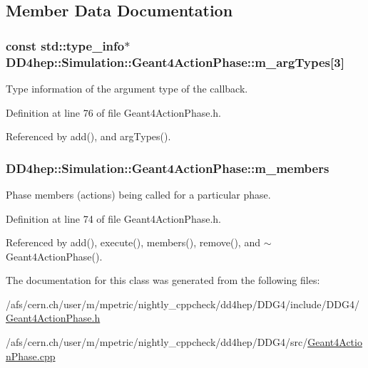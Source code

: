 \subsection{Member Data Documentation}
\hypertarget{class_d_d4hep_1_1_simulation_1_1_geant4_action_phase_a92e33c1a9f3cdbd49cf3b31a61213f57}{
\subsubsection[{m\_\-argTypes}]{\setlength{\rightskip}{0pt plus 5cm}const std::type\_\-info$\ast$ {\bf DD4hep::Simulation::Geant4ActionPhase::m\_\-argTypes}\mbox{[}3\mbox{]}}}
\label{class_d_d4hep_1_1_simulation_1_1_geant4_action_phase_a92e33c1a9f3cdbd49cf3b31a61213f57}


Type information of the argument type of the callback. 

Definition at line 76 of file Geant4ActionPhase.h.

Referenced by add(), and argTypes().\hypertarget{class_d_d4hep_1_1_simulation_1_1_geant4_action_phase_a24b9ef3a3dbb361f17a5e2600dc6f57d}{
\subsubsection[{m\_\-members}]{ {\bf DD4hep::Simulation::Geant4ActionPhase::m\_\-members}}}
\label{class_d_d4hep_1_1_simulation_1_1_geant4_action_phase_a24b9ef3a3dbb361f17a5e2600dc6f57d}


Phase members (actions) being called for a particular phase. 

Definition at line 74 of file Geant4ActionPhase.h.

Referenced by add(), execute(), members(), remove(), and $\sim$Geant4ActionPhase().

The documentation for this class was generated from the following files:\begin{DoxyCompactItemize}
\item 
/afs/cern.ch/user/m/mpetric/nightly\_\-cppcheck/dd4hep/DDG4/include/DDG4/\hyperlink{_geant4_action_phase_8h}{Geant4ActionPhase.h}\item 
/afs/cern.ch/user/m/mpetric/nightly\_\-cppcheck/dd4hep/DDG4/src/\hyperlink{_geant4_action_phase_8cpp}{Geant4ActionPhase.cpp}\end{DoxyCompactItemize}
